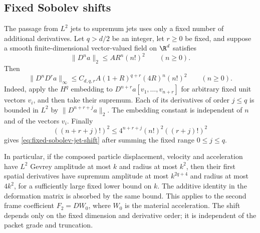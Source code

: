 \subsection{Fixed Sobolev shifts}
The passage from $L^2$ jets to supremum jets uses only a fixed number of
additional derivatives. Let $q>d/2$ be an integer, let $r\ge0$ be fixed,
and suppose a smooth finite-dimensional vector-valued field on $\R^d$
satisfies
\[
 \|D^n a\|_2\le A R^n(n!)^2\qquad(n\ge0).
\]
Then
\begin{equation}\label{eq:fixed-sobolev-jet-shift}
 \|D^nD^r a\|_\infty
 \le C_{d,q,r}A(1+R)^{q+r}(4R)^n(n!)^2\qquad(n\ge0).
\end{equation}
Indeed, apply the $H^q$ embedding to
$D^{n+r}a[v_1,\ldots,v_{n+r}]$ for arbitrary fixed unit vectors
$v_i$, and then take their supremum. Each of its derivatives of order
$j\le q$ is bounded in $L^2$ by $\|D^{n+r+j}a\|_2$.
The embedding constant is independent of $n$ and of the vectors $v_i$.
Finally
\[
 ((n+r+j)!)^2\le4^{n+r+j}(n!)^2((r+j)!)^2
\]
gives \eqref{eq:fixed-sobolev-jet-shift} after summing the fixed range
$0\le j\le q$.

In particular, if the composed particle displacement, velocity and
acceleration have $L^2$ Gevrey amplitude at most $k$ and radius at most
$k^2$, then their first spatial derivatives have supremum amplitude
at most $k^{2q+4}$ and radius at most $4k^2$, for a sufficiently large
fixed lower bound on $k$. The additive identity in the deformation
matrix is absorbed by the same bound. This applies to the second frame
coefficient $F_2=D W_0$, where $W_0$ is the material acceleration.
The shift depends only on the fixed dimension and derivative order;
it is independent of the packet grade and truncation.
